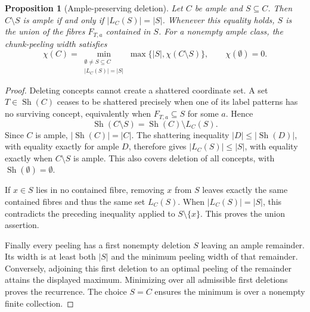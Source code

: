 \documentclass[11pt]{article}
\newtheorem{proposition}{Proposition}[section]
\theoremstyle{definition}
\newcommand{\Sh}{\operatorname{Sh}}
\begin{document}
\begin{proposition}[Ample-preserving deletion]\label{prop:tight-sets}
Let $C$ be ample and $S\subseteq C$. Then $C\setminus S$ is ample
if and only if $|L_C(S)|=|S|$. Whenever this equality holds, $S$ is the
union of the fibres $F_{T,a}$ contained in $S$.
For a nonempty ample class, the chunk-peeling width satisfies
\[
 \chi(C)=
 \min_{\substack{\emptyset\ne S\subseteq C\\|L_C(S)|=|S|}}
       \max\{|S|,\chi(C\setminus S)\},
 \qquad \chi(\emptyset)=0.
\]
\end{proposition}
\begin{proof}
Deleting concepts cannot create a shattered coordinate set.
A set $T\in\Sh(C)$ ceases to be shattered precisely when one of its
label patterns has no surviving concept, equivalently when
$F_{T,a}\subseteq S$ for some $a$. Hence
\[
 \Sh(C\setminus S)=\Sh(C)\setminus L_C(S).
\]
Since $C$ is ample, $|\Sh(C)|=|C|$. The shattering inequality
$|D|\le|\Sh(D)|$, with equality exactly for ample $D$, therefore gives
$|L_C(S)|\le|S|$, with equality exactly when $C\setminus S$ is ample.
This also covers deletion of all concepts, with
$\Sh(\emptyset)=\emptyset$.

If $x\in S$ lies in no contained fibre, removing $x$ from $S$ leaves
exactly the same contained fibres and thus the same set $L_C(S)$.
When $|L_C(S)|=|S|$, this contradicts the preceding inequality applied
to $S\setminus\{x\}$. This proves the union assertion.

Finally every peeling has a first nonempty deletion $S$ leaving an ample
remainder. Its width is at least both $|S|$ and the minimum peeling width
of that remainder. Conversely, adjoining this first deletion to an optimal
peeling of the remainder attains the displayed maximum. Minimizing over
all admissible first deletions proves the recurrence. The choice $S=C$
ensures the minimum is over a nonempty finite collection.
\end{proof}
\end{document}
